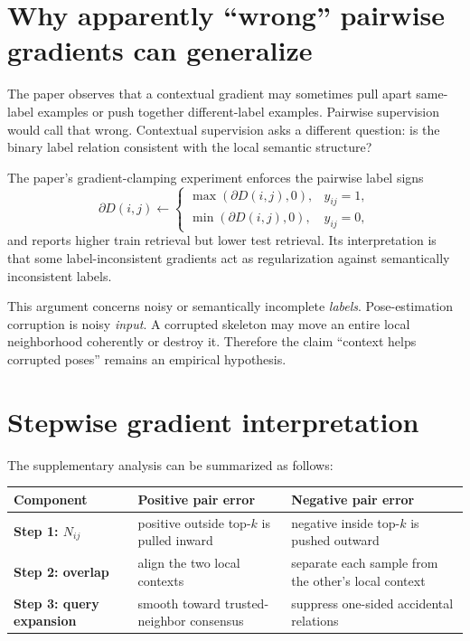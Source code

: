 \documentclass[11pt,oneside,openany]{book}
\theoremstyle{myplain}
\theoremstyle{definition}
\newcommand{\paperEq}[1]{\tag{P#1}}
\begin{document}
\section{Why apparently ``wrong'' pairwise gradients can generalize}

The paper observes that a contextual gradient may sometimes pull apart same-label examples or push together different-label examples. Pairwise supervision would call that wrong. Contextual supervision asks a different question: is the binary label relation consistent with the local semantic structure?

The paper's gradient-clamping experiment enforces the pairwise label signs
\begin{equation*}
\partial D(i,j)\leftarrow
\begin{cases}
\max(\partial D(i,j),0),&y_{ij}=1,\\
\min(\partial D(i,j),0),&y_{ij}=0,
\end{cases}
\paperEq{10}
\label{eq:clamp}
\end{equation*}
and reports higher train retrieval but lower test retrieval. Its interpretation is that some label-inconsistent gradients act as regularization against semantically inconsistent labels.

\begin{warningbox}[title=Critical distinction for the pose proposal]
This argument concerns noisy or semantically incomplete \emph{labels}. Pose-estimation corruption is noisy \emph{input}. A corrupted skeleton may move an entire local neighborhood coherently or destroy it. Therefore the claim ``context helps corrupted poses'' remains an empirical hypothesis.
\end{warningbox}

\section{Stepwise gradient interpretation}

The supplementary analysis can be summarized as follows:

\begin{center}
\begin{tabularx}{\textwidth}{>{\bfseries}p{}X X}
\toprule
Component & Positive pair error & Negative pair error \\
\midrule
Step 1: $N_{ij}$ & positive outside top-$k$ is pulled inward & negative inside top-$k$ is pushed outward \\
Step 2: overlap & align the two local contexts & separate each sample from the other's local context \\
Step 3: query expansion & smooth toward trusted-neighbor consensus & suppress one-sided accidental relations \\
\bottomrule
\end{tabularx}
\end{center}
\end{document}
